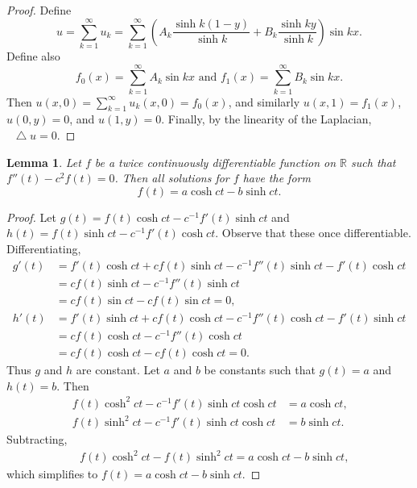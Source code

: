 \documentclass[oneside]{article}
\newcommand*\Laplace{\mathop{}\!\mathbin\bigtriangleup}
\newcommand\bbR{\mathbb{R}}
\newtheorem*{lem}{Lemma}
\begin{document}
\begin{enumerate}[label=\textbf{\arabic*.}]
\begin{proof}
    Define \[
      u = \sum_{k=1}^\infty u_k
        = \sum_{k=1}^\infty \left(A_k\frac{\sinh k(1-y)}{\sinh k}
               + B_k\frac{\sinh ky}{\sinh k}\right)\sin kx \text{.}
    \] Define also\[
      f_0(x) = \sum_{k=1}^\infty A_k\sin kx\text{ and }
      f_1(x) = \sum_{k=1}^\infty B_k\sin kx\text{.}
    \] Then $u(x, 0) = \sum_{k=1}^\infty u_k (x, 0) = f_0(x)$, and similarly
    $u(x, 1) = f_1(x)$, $u(0, y) = 0$, and $u(1, y) = 0$. Finally, by the linearity
    of the Laplacian, $\Laplace u = 0$.\end{proof}

    \begin{lem} Let $f$ be a twice continuously differentiable function on $\bbR$
    such that $f''(t) - c^2f(t) = 0$. Then all solutions for $f$ have the form\[
      f(t) = a\cosh ct - b\sinh ct \text{.}
    \]
    \end{lem}

    \begin{proof}
    Let $g(t) = f(t)\cosh ct - c^{-1} f'(t) \sinh ct$ and
    $h(t) = f(t)\sinh ct - c^{-1} f'(t) \cosh ct$. Observe that these once
    differentiable. Differentiating,
      \begin{align*}
        g'(t)
        &= f'(t)\cosh ct + cf(t)\sinh ct - c^{-1} f''(t) \sinh ct - f'(t) \cosh ct \\
        &= cf(t)\sinh ct - c^{-1} f''(t) \sinh ct \\
        &= cf(t)\sin ct - c f(t) \sin ct = 0\text{,} \\
        h'(t)
        &= f'(t)\sinh ct + cf(t)\cosh ct - c^{-1} f''(t) \cosh ct - f'(t) \sinh ct \\
        &= cf(t)\cosh ct - c^{-1} f''(t) \cosh ct \\
        &= cf(t)\cosh ct - cf(t) \cosh ct = 0\text{.}
      \end{align*} Thus $g$ and $h$ are constant. Let $a$ and $b$ be constants such
      that $g(t) = a$ and $h(t) = b$. Then \begin{align*}
        f(t)\cosh^2 ct - c^{-1} f'(t) \sinh ct\cosh ct &= a\cosh ct \text{,} \\
        f(t)\sinh^2 ct - c^{-1} f'(t) \sinh ct\cosh ct &= b\sinh ct \text{.}
      \end{align*}Subtracting,\begin{align*}
        &f(t)\cosh^2 ct - f(t)\sinh^2 ct = a\cosh ct - b\sinh ct \text{,}
      \end{align*} which simplifies to $f(t) = a\cosh ct - b\sinh ct$.
    \end{proof}
  \end{enumerate}
\end{document}
